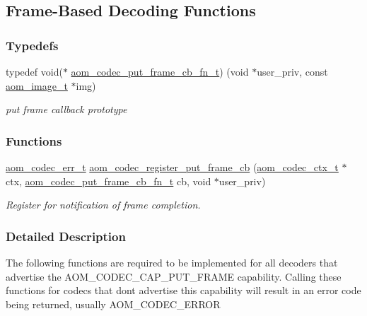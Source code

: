 \hypertarget{group__cap__put__frame}{}\subsection{Frame-\/\+Based Decoding Functions}
\label{group__cap__put__frame}
\subsubsection*{Typedefs}
\begin{DoxyCompactItemize}
\item 
typedef void($\ast$ \hyperlink{group__cap__put__frame_gade62af02658acd724fda731b6300eec7}{aom\+\_\+codec\+\_\+put\+\_\+frame\+\_\+cb\+\_\+fn\+\_\+t}) (void $\ast$user\+\_\+priv, const \hyperlink{aom__image_8h_a5409ae8fdb326fe1cc32622ef4e23748}{aom\+\_\+image\+\_\+t} $\ast$img)
\begin{DoxyCompactList}\small\item\em put frame callback prototype \end{DoxyCompactList}\end{DoxyCompactItemize}
\subsubsection*{Functions}
\begin{DoxyCompactItemize}
\item 
\hyperlink{group__codec_gaaae61e0f8663e6137f1e228757248e7c}{aom\+\_\+codec\+\_\+err\+\_\+t} \hyperlink{group__cap__put__frame_ga0d6672fef284041573a29b76a0a5ef1b}{aom\+\_\+codec\+\_\+register\+\_\+put\+\_\+frame\+\_\+cb} (\hyperlink{group__codec_ga9a1d27f9742d9f70783e3c6cb849b5b4}{aom\+\_\+codec\+\_\+ctx\+\_\+t} $\ast$ctx, \hyperlink{group__cap__put__frame_gade62af02658acd724fda731b6300eec7}{aom\+\_\+codec\+\_\+put\+\_\+frame\+\_\+cb\+\_\+fn\+\_\+t} cb, void $\ast$user\+\_\+priv)
\begin{DoxyCompactList}\small\item\em Register for notification of frame completion. \end{DoxyCompactList}\end{DoxyCompactItemize}


\subsubsection{Detailed Description}
The following functions are required to be implemented for all decoders that advertise the A\+O\+M\+\_\+\+C\+O\+D\+E\+C\+\_\+\+C\+A\+P\+\_\+\+P\+U\+T\+\_\+\+F\+R\+A\+ME capability. Calling these functions for codecs that don\textquotesingle{}t advertise this capability will result in an error code being returned, usually A\+O\+M\+\_\+\+C\+O\+D\+E\+C\+\_\+\+E\+R\+R\+OR 

